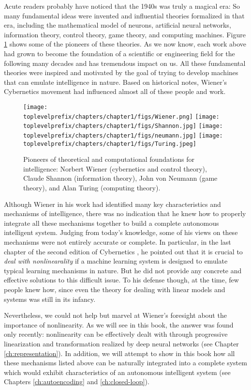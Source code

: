 \documentclass[../../book-main.tex]{subfiles}
\begin{document}
Acute readers probably have noticed that the 1940s was truly a magical era: So many fundamental ideas were invented and influential theories formalized in that era, including the mathematical model of neurons, artificial neural networks, information theory, control theory, game theory, and computing machines. Figure \ref{fig:god-fathers} shows some of the pioneers of these theories. As we now know, each work above had grown to become the foundation of a scientific or engineering field for the following many decades and has tremendous impact on us. All these fundamental theories were inspired and motivated by the goal of trying to develop machines that can emulate intelligence in nature. Based on historical notes, Wiener's Cybernetics movement had influenced almost all of these people and work. 
\begin{figure}
    \centering
    \texttt{[image: \\toplevelprefix/chapters/chapter1/figs/Wiener.png]}
    \texttt{[image: \\toplevelprefix/chapters/chapter1/figs/Shannon.jpg]}
    \texttt{[image: \\toplevelprefix/chapters/chapter1/figs/neumann.jpg]}
    \texttt{[image: \\toplevelprefix/chapters/chapter1/figs/Turing.jpeg]}
    \caption{Pioneers of theoretical and computational foundations for intelligence: Norbert Wiener (cybernetics and control theory), Claude Shannon (information theory), John von Neumann (game theory), and Alan Turing (computing theory).}
    \label{fig:god-fathers}
\end{figure}

Although Wiener in his work had identified many key characteristics and mechanisms of intelligence, there was no indication that he knew how to properly integrate all these mechanisms together to build a complete autonomous intelligent system. Judging from today's knowledge, some of his views on these mechanisms were not entirely accurate or complete. In particular, in the last chapter of the second edition of Cybernetics \cite{Wiener-Cybernetics-1961}, he pointed out that it is crucial to {\em deal with nonlinearality} if a machine learning system is designed to emulate typical learning mechanisms in nature. But he did not provide any concrete and effective solutions to this difficult issue. To his defense though, at the time, few people knew how, since even the theory for dealing with linear models and systems was still in its infancy. 

Nevertheless, we could not help but marvel at Wiener's foresight about the importance of nonlinearity. As we will see in this book, the answer was found only recently: nonlinearity can be effectively dealt with through progressive linearization and transformation realized by deep neural networks (see Chapter \ref{ch:representation}). In addition, we will attempt to show in this book how all these mechanisms listed above can be naturally integrated into a complete system which would exhibit characteristics of an autonomous intelligent system (see Chapters \ref{ch:autoencoding} and \ref{ch:closed-loop}). 
\end{document}
